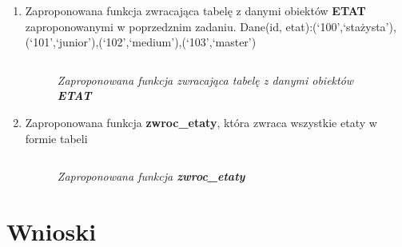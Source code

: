 \documentclass{article}
\begin{document}
\begin{enumerate}
\item Zaproponowana funkcja zwracająca tabelę z danymi obiektów \textbf{ETAT} zaproponowanymi w poprzedznim zadaniu. Dane(id, etat):(`100',`stażysta'),(`101',`junior'),(`102',`medium'),(`103',`master')

	\begin{lstlisting}[style=SQL, caption=\textit{Zaproponowana funkcja zwracająca tabelę z danymi obiektów \textbf{ETAT}}]
	\end{lstlisting}

	\begin{figure}[H]
		\centering
		\caption{\textit{Zaproponowana funkcja zwracająca tabelę z danymi obiektów \textbf{ETAT}}}
	\end{figure}
\item Zaproponowana funkcja \textbf{zwroc\_etaty}, która zwraca wszystkie etaty w formie tabeli

	\begin{lstlisting}[style=SQL, caption=\textit{Zaproponowana funkcja \textbf{zwroc\_etaty}}]
	\end{lstlisting}

	\begin{figure}[H]
		\centering
		\caption{\textit{Zaproponowana funkcja \textbf{zwroc\_etaty}}}
	\end{figure}
\end{enumerate}

\section{Wnioski}
\end{document}
